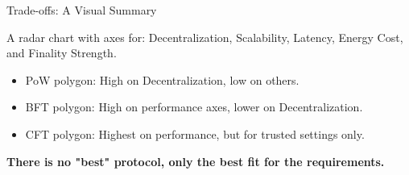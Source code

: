 \documentclass[aspectratio=169]{beamer}
\newcommand{\placeholdergraphic}[2][\linewidth]{%
  \begin{tcolorbox}[
    enhanced, colback=white, colframe=usmagray,
    title=Graphic placeholder, width=#1, sharp corners,
    boxrule=0.5pt, left=4pt,right=4pt,top=6pt,bottom=6pt
  ]
    \footnotesize #2
  \end{tcolorbox}
}
\begin{document}
\begin{frame}{Trade-offs: A Visual Summary}
    \placeholdergraphic{A radar chart with axes for: Decentralization, Scalability, Latency, Energy Cost, and Finality Strength.
    \begin{itemize}\footnotesize
        \item PoW polygon: High on Decentralization, low on others.
        \item BFT polygon: High on performance axes, lower on Decentralization.
        \item CFT polygon: Highest on performance, but for trusted settings only.
    \end{itemize}
    }
    \vfill
    \begin{center}\large\textbf{There is no "best" protocol, only the best fit for the requirements.}\end{center}
\end{frame}
\end{document}
